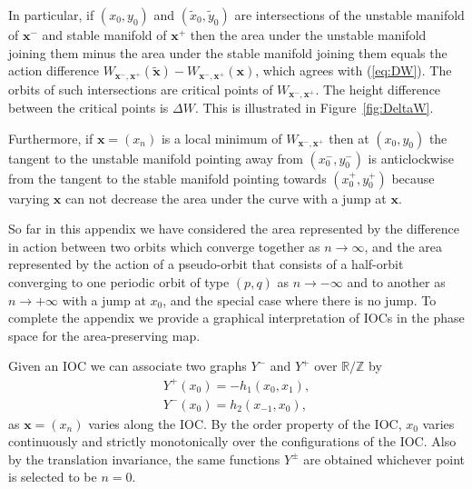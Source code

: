 \documentclass[12pt]{article}
\newcommand{\R}{\mathbb{R}}
\newcommand{\Z}{\mathbb{Z}}
\newcounter{number}
\newcommand{\xbf}{{\mathbf{x}}}
\begin{document}
In particular, if $(x_0,y_0)$ and $(\tilde{x}_0,\tilde{y}_0)$ are intersections of the unstable manifold of $\xbf^-$ and stable manifold of $\xbf^+$
then the area under the unstable manifold joining them minus the area under the stable manifold joining them equals the action difference
$W_{\xbf^-,\xbf^+}(\tilde{\xbf})-W_{\xbf^-,\xbf^+}(\xbf)$, which agrees with (\ref{eq:DW}).  The orbits of such intersections are critical points of $W_{\xbf^-,\xbf^+}$.  The height difference between the critical points is $\Delta W$.  This is illustrated in Figure~\ref{fig:DeltaW}.


Furthermore, if $\xbf=(x_n)$ is a local minimum of $W_{\xbf^-,\xbf^+}$ then at $(x_0,y_0)$ the tangent to the unstable manifold pointing away from $(x^-_0,y^-_0)$ is anticlockwise from the tangent to the stable manifold pointing towards $(x^+_0,y^+_0)$ because varying $\xbf$ can not decrease the area under the curve with a jump at $\xbf$.

So far in this appendix we have considered the area represented by the difference in  action between two orbits which converge together as  $n \to \infty$, and the area represented by the action of a pseudo-orbit that consists of a half-orbit converging to one periodic orbit of type $(p,q)$ as $n\to -\infty$ and to another as $n\to +\infty$ with a jump at $x_0$, and the special case where there is no jump.  To complete the appendix we provide a graphical interpretation of IOCs in the phase space for the area-preserving map.

Given an IOC we can associate two graphs $Y^-$ and $Y^+$ over $\R/\Z$ by
\begin{eqnarray}
Y^+(x_0) = -h_1(x_0,x_1), \nonumber \\
Y^-(x_0) = h_2(x_{-1},x_0), \nonumber
\end{eqnarray}
as $\xbf=(x_n)$ varies along the IOC.  By the order property of the IOC, $x_0$ varies continuously and strictly monotonically over the configurations of the IOC.  Also by the translation invariance, the same functions $Y^\pm$ are obtained whichever point is selected to be $n=0$.
\end{document}
